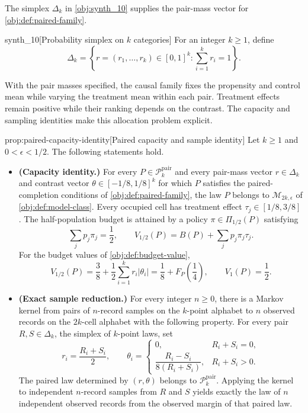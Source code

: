 The simplex \(\Delta_k\) in \cref{obj:synth_10} supplies the pair-mass vector for \cref{obj:def:paired-family}.

\begin{definitionv}{synth_10}[Probability simplex on \(k\) categories]
For an integer \(k\geq1\), define
\[
\Delta_k=\left\{r=(r_1,\ldots,r_k)\in[0,1]^k:\sum_{i=1}^k r_i=1\right\}.
\]
\end{definitionv}

With the pair masses specified, the causal family fixes the propensity and control mean while varying the treatment mean within each pair. Treatment effects remain positive while their ranking depends on the contrast. The capacity and sampling identities make this allocation problem explicit.

\begin{propositionv}{prop:paired-capacity-identity}[Paired capacity and sample identity]
Let \(k\geq 1\) and \(0<\epsilon<1/2\). The following statements hold.
\begin{itemize}
\item \textbf{(Capacity identity.)} For every \(P\in\mathcal P^{\mathrm{pair}}_k\) and every pair-mass vector \(r\in\Delta_k\) and contrast vector \(\theta\in[-1/8,1/8]^k\) for which \(P\) satisfies the paired-completion conditions of \cref{obj:def:paired-family}, the law \(P\) belongs to \(\mathcal M_{2k,\epsilon}\) of \cref{obj:def:model-class}. Every occupied cell has treatment effect \(\tau_j\in[1/8,3/8]\). The half-population budget is attained by a policy \(\pi\in\Pi_{1/2}(P)\) satisfying
\[
\sum_j p_j\pi_j=\frac12,
\qquad
V_{1/2}(P)=B(P)+\sum_j p_j\pi_j\tau_j.
\]
For the budget values of \cref{obj:def:budget-value},
\[
V_{1/2}(P)
=\frac38+\frac12\sum_{i=1}^k r_i|\theta_i|
=\frac18+F_P\!\left(\frac14\right),
\qquad
V_1(P)=\frac12.
\]

\item \textbf{(Exact sample reduction.)} For every integer \(n\geq0\), there is a Markov kernel from pairs of \(n\)-record samples on the \(k\)-point alphabet to \(n\) observed records on the \(2k\)-cell alphabet with the following property. For every pair \(R,S\in\Delta_k\), the simplex of \(k\)-point laws, set
\[
r_i=\frac{R_i+S_i}{2},
\qquad
\theta_i=
\begin{cases}
0, & R_i+S_i=0,\\[2pt]
\dfrac{R_i-S_i}{8(R_i+S_i)}, & R_i+S_i>0.
\end{cases}
\]
The paired law determined by \((r,\theta)\) belongs to \(\mathcal P^{\mathrm{pair}}_k\). Applying the kernel to independent \(n\)-record samples from \(R\) and \(S\) yields exactly the law of \(n\) independent observed records from the observed margin of that paired law.
\end{itemize}
\end{propositionv}

